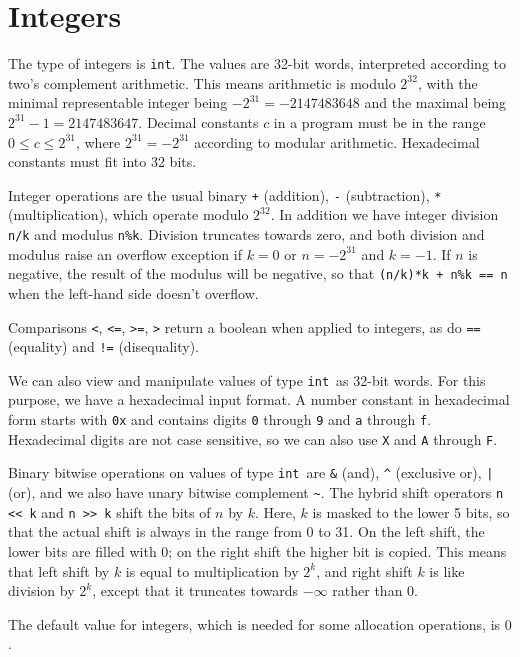 \documentclass[11pt]{article}
\newcommand{\tint}{\texttt{int}}
\begin{document}
\section{Integers}

The type of integers is \tint.  The values are 32-bit words,
interpreted according to two's complement arithmetic.  This means
arithmetic is modulo $2^{32}$, with the minimal representable integer
being $-2^{31} = -2147483648$ and the maximal being $2^{31}-1 = 2147483647$.
Decimal constants $c$ in a program must be in the range $0 \leq c
\leq 2^{31}$, where $2^{31} = -2^{31}$ according to modular
arithmetic.  Hexadecimal constants must fit into 32 bits.

Integer operations are the usual binary \verb'+' (addition), \verb'-'
(subtraction), \verb'*' (multiplication), which operate modulo
$2^{32}$.  In addition we have integer division \verb'n/k' and modulus
\verb'n%k'.  Division truncates towards zero, and
both division and modulus raise an overflow exception if $k = 0$ or $n
= -2^{31}$ and $k = -1$.  If $n$ is negative, the result of the
modulus will be negative, so that \verb'(n/k)*k + n%k == n' when the
left-hand side doesn't overflow.

Comparisons \verb'<', \verb'<=', \verb'>=', \verb'>' return
a boolean when applied to integers, as do \verb'==' (equality)
and \verb'!=' (disequality).

We can also view and manipulate values of type \tint\ as 32-bit words.
For this purpose, we have a hexadecimal input format.  A number
constant in hexadecimal form starts with \verb'0x' and contains digits
\verb'0' through \verb'9' and \verb'a' through \verb'f'.  Hexadecimal
digits are not case sensitive, so we can also use \verb'X' and
\verb'A' through \verb'F'.

Binary bitwise operations on values of type \tint\ are \verb'&' (and),
\verb'^' (exclusive or), \verb'|' (or), and we also have unary bitwise
complement \verb'~'.  The hybrid shift operators \verb'n << k' and
\verb'n >> k' shift the bits of $n$ by $k$.  Here, $k$ is masked to
the lower 5 bits, so that the actual shift is always in the range from
0 to 31.  On the left shift, the lower bits are filled with 0; on the
right shift the higher bit is copied.  This means that left shift by
$k$ is equal to multiplication by $2^k$, and right shift $k$ is like
division by $2^k$, except that it truncates towards $-\infty$ rather
than $0$.

The default value for integers, which is needed for some allocation
operations, is $0$.
\end{document}
